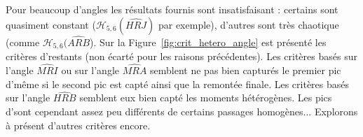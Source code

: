\documentclass[main.tex]{subfiles}
\begin{document}
Pour beaucoup d'angles les résultats fournis sont insatisfaisant : certains sont quasiment constant ($\mathcal{H}_{5,6}(\widehat{HRJ})$ par exemple), d'autres sont très chaotique (comme $\mathcal{H}_{5,6}(\widehat{ARB}$). Sur la Figure~\ref{fig:crit_hetero_angle} est présenté les critères d'\hetero restants (\ie non écarté pour les raisons précédentes). 
Les critères basés sur l'angle $\widehat{MRI}$ ou sur l'angle $\widehat{MRA}$ semblent ne pas bien capturés le premier pic d'\hetero même si le second pic est capté ainsi que la remontée finale. Les critères basés sur l'angle $\widehat{HRB}$ semblent eux bien capté les moments hétérogènes. Les pics d'\hetero sont cependant %
assez peu différents de certains passages homogènes... 
Explorons à présent d'autres critères encore.
\end{document}
